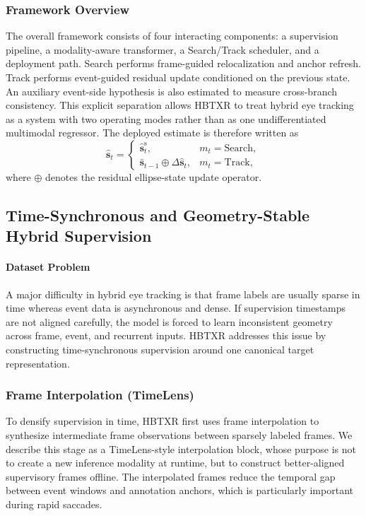 \documentclass[journal]{IEEEtran}
\begin{document}
\subsubsection{Framework Overview}
The overall framework consists of four interacting components: a supervision pipeline, a modality-aware transformer, a Search/Track scheduler, and a deployment path. Search performs frame-guided relocalization and anchor refresh. Track performs event-guided residual update conditioned on the previous state. An auxiliary event-side hypothesis is also estimated to measure cross-branch consistency. This explicit separation allows HBTXR to treat hybrid eye tracking as a system with two operating modes rather than as one undifferentiated multimodal regressor. The deployed estimate is therefore written as
\begin{equation}
\hat{\mathbf{s}}_t=
\begin{cases}
\hat{\mathbf{s}}_t^{\mathrm{s}}, & m_t=\mathrm{Search},\\
\bar{\mathbf{s}}_{t-1}\oplus\Delta\hat{\mathbf{s}}_t, & m_t=\mathrm{Track},
\end{cases}
\end{equation}
where $\oplus$ denotes the residual ellipse-state update operator.

\subsection{Time-Synchronous and Geometry-Stable Hybrid Supervision}
\paragraph*{Dataset Problem}
A major difficulty in hybrid eye tracking is that frame labels are usually sparse in time whereas event data is asynchronous and dense. If supervision timestamps are not aligned carefully, the model is forced to learn inconsistent geometry across frame, event, and recurrent inputs. HBTXR addresses this issue by constructing time-synchronous supervision around one canonical target representation.

\subsubsection{Frame Interpolation (TimeLens)}
To densify supervision in time, HBTXR first uses frame interpolation to synthesize intermediate frame observations between sparsely labeled frames. We describe this stage as a TimeLens-style interpolation block, whose purpose is not to create a new inference modality at runtime, but to construct better-aligned supervisory frames offline. The interpolated frames reduce the temporal gap between event windows and annotation anchors, which is particularly important during rapid saccades.
\end{document}
